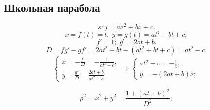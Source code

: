 \subsection{Школьная парабола}
$$s: y = ax^2 + bx + c.$$
$$x = f(t) = t,\; y = g(t) = at^2 + bt + c;$$
$$f' = 1; \; g' = 2at + b.$$
$$D = fg' - gf' = 2at^2 + bt - (at^2 + bt + c) = at^2 - c.$$
$$
\left\{
\begin{gathered}
	\bar{x} = -\frac{f'}{D} = -\frac{1}{at^2 - c}, \\
	\bar{y} = \frac{g'}{D} = \frac{2at + b}{at^2 - c};
\end{gathered}
\right.
\Rightarrow
\left\{
\begin{gathered}
	at^2 - c = -\frac{1}{\bar{x}}, \\
	\bar{y} = -\left(2at + b\right)\bar{x};
\end{gathered}
\right.
$$






$$\bar{\rho}^2 = \bar{x}^2 + \bar{y}^2 = \frac{1 + \left(at + b\right)^2}{D^2};$$


